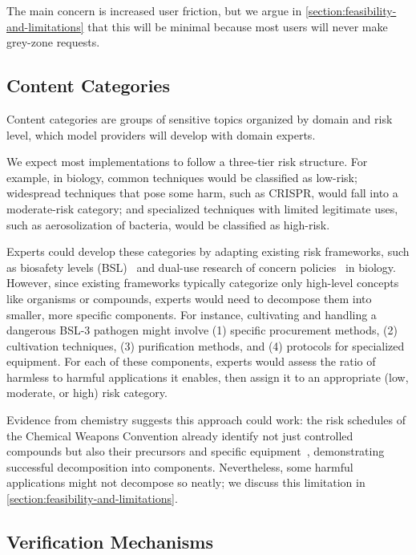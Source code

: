 \documentclass{article}
\theoremstyle{plain}
\theoremstyle{definition}
\theoremstyle{remark}
\begin{document}
The main concern is increased user friction, but we argue in \cref{section:feasibility-and-limitations} that this will be minimal because most users will never make grey-zone requests.


\subsection{Content Categories} \label{section:content-categories}

Content categories are groups of sensitive topics organized by domain and risk level, which model providers will develop with domain experts.

We expect most implementations to follow a three-tier risk structure.
For example, in biology, common techniques would be classified as low-risk;
widespread techniques that pose some harm, such as CRISPR, would fall into a moderate-risk category;
and specialized techniques with limited legitimate uses, such as aerosolization of bacteria, would be classified as high-risk.

Experts could develop these categories by adapting existing risk frameworks, such as biosafety levels (BSL)~\cite{CDC_BMBL_2020} and dual-use research of concern policies~\cite{USG_DURC_2012} in biology.
However, since existing frameworks typically categorize only high-level concepts like organisms or compounds, experts would need to decompose them into smaller, more specific components.
For instance, cultivating and handling a dangerous BSL-3 pathogen might involve (1) specific procurement methods, (2) cultivation techniques, (3) purification methods, and (4) protocols for specialized equipment.
For each of these components, experts would assess the ratio of harmless to harmful applications it enables, then assign it to an appropriate (low, moderate, or high) risk category.

Evidence from chemistry suggests this approach could work: the risk schedules of the Chemical Weapons Convention already identify not just controlled compounds but also their precursors and specific equipment~\cite{OPCW_CWC_1993}, demonstrating successful decomposition into components.
Nevertheless, some harmful applications might not decompose so neatly; we discuss this limitation in \cref{section:feasibility-and-limitations}.

\subsection{Verification Mechanisms} \label{section:verification-mechanisms}
\end{document}
